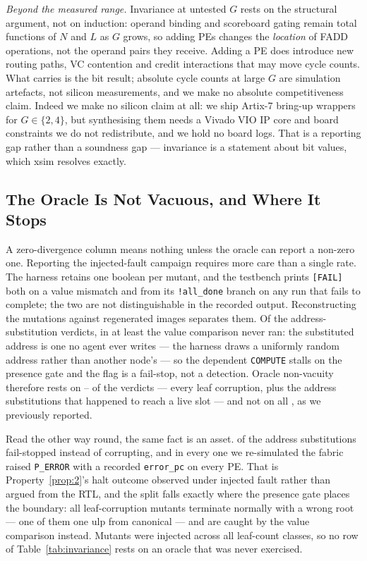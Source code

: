 \documentclass[journal,10pt]{IEEEtran}
\theoremstyle{plain}
\theoremstyle{definition}
\theoremstyle{remark}
\newcommand{\sv}[1]{\texttt{#1}}
\begin{document}
\emph{Beyond the measured range.} Invariance at untested $G$ rests on the
structural argument, not on induction: operand binding and scoreboard gating
remain total functions of $N$ and $L$ as $G$ grows, so adding PEs changes the
\emph{location} of FADD operations, not the operand pairs they receive. Adding
a PE does introduce new routing paths, VC contention and credit interactions
that may move cycle counts. What carries is the bit result; absolute cycle
counts at large $G$ are simulation artefacts, not silicon measurements, and we
make no absolute competitiveness claim. Indeed we make no silicon claim at
all: we ship Artix-7 bring-up wrappers for $G \in \{2,4\}$, but synthesising
them needs a Vivado VIO IP core and board constraints we do not redistribute,
and we hold no board logs. That is a reporting gap rather than a soundness
gap --- invariance is a statement about bit values, which xsim resolves
exactly.

\subsection{The Oracle Is Not Vacuous, and Where It Stops}

A zero-divergence column means nothing unless the oracle can report a non-zero
one. Reporting the injected-fault campaign requires more care than a single
rate. The harness retains one boolean per mutant, and the testbench prints
\sv{[FAIL]} both on a value mismatch and from its \sv{!all\_done} branch on
any run that fails to complete; the two are not distinguishable in the
recorded output. Reconstructing the mutations against regenerated images
separates them. Of the \MutVerdicts{} address-substitution verdicts, in at
least \MutNoCompare{} the value comparison never ran: the substituted address
is one no agent ever writes --- the harness draws a uniformly random address
rather than another node's --- so the dependent \texttt{COMPUTE} stalls on the
presence gate and the flag is a fail-stop, not a detection. Oracle
non-vacuity therefore rests on \MutOracleLo{}--\MutOracleHi{} of the
\MutTotal{} verdicts --- every leaf corruption, plus the address substitutions
that happened to reach a live slot --- and not on all \MutTotal{}, as we
previously reported.

Read the other way round, the same fact is an asset. \MutAddrStall{} of the
\MutAddrSub{} address substitutions fail-stopped instead of corrupting, and in
every one we re-simulated the fabric raised \texttt{P\_ERROR} with a recorded
\sv{error\_pc} on every PE. That is Property~\ref{prop:2}'s halt outcome
observed under injected fault rather than argued from the RTL, and the split
falls exactly where the presence gate places the boundary: all \MutLeaf{}
leaf-corruption mutants terminate normally with a wrong root --- one of them
one ulp from canonical --- and are caught by the value comparison instead.
Mutants were injected across all \InvLeafCounts{} leaf-count classes, so no
row of Table~\ref{tab:invariance} rests on an oracle that was never exercised.
\end{document}

